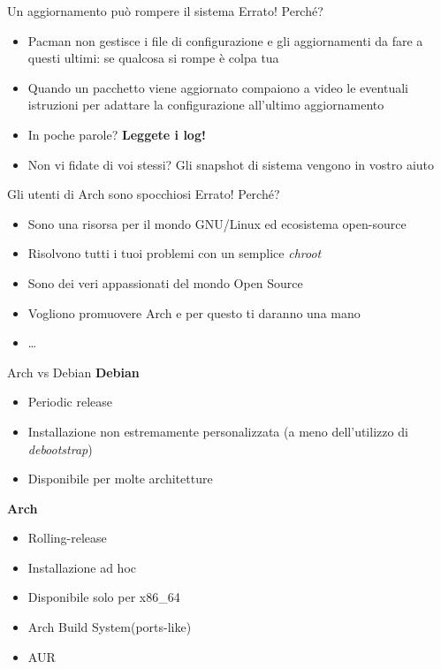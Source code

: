 
\begin{frame}{Un aggiornamento può rompere il sistema}
    \alert{Errato!} Perché?
    \begin{itemize}
        \item Pacman non gestisce i file di configurazione e gli aggiornamenti da fare a questi ultimi: se qualcosa si rompe è colpa tua
        \item Quando un pacchetto viene aggiornato compaiono a video le eventuali istruzioni per adattare la configurazione all'ultimo aggiornamento 
        \item In poche parole? \textbf{Leggete i log!}
        \item Non vi fidate di voi stessi? Gli snapshot di sistema vengono in vostro aiuto
    \end{itemize}
\end{frame}


\begin{frame}{Gli utenti di Arch sono spocchiosi}
    \alert{Errato!} Perché?
    \begin{itemize}
        \item Sono una risorsa per il mondo GNU/Linux ed ecosistema open-source
        \item Risolvono tutti i tuoi problemi con un semplice \textit{chroot}
        \item Sono dei veri appassionati del mondo Open Source
        \item Vogliono promuovere Arch e per questo ti daranno una mano
        \item \dots
    \end{itemize}
\end{frame}


\begin{frame}{Arch vs Debian}
    \textbf{Debian}
    \begin{itemize}
        \item Periodic release
        \item Installazione non estremamente personalizzata (a meno dell'utilizzo di \textit{debootstrap})
        \item Disponibile per molte architetture
    \end{itemize}

    \textbf{Arch}
    \begin{itemize}
        \item Rolling-release
        \item Installazione ad hoc
        \item Disponibile solo per x86\_64
        \item Arch Build System(ports-like)
        \item AUR
    \end{itemize}
\end{frame}

